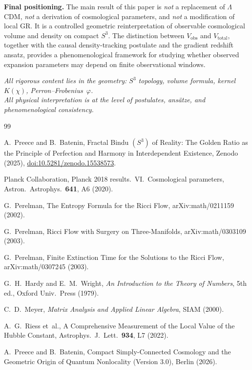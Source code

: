 \documentclass[12pt,a4paper]{amsart}
\theoremstyle{plain}
\theoremstyle{definition}
\theoremstyle{remark}
\newcommand{\vp}{\varphi}
\newcommand{\Sthree}{S^3}
\newcommand{\LCDM}{\ensuremath{\Lambda}CDM}
\newcommand{\Vtot}{V_{\mathrm{total}}}
\newcommand{\Vobs}{V_{\mathrm{obs}}}
\begin{document}
\medskip
\noindent\textbf{Final positioning.} The main result of this paper
is \emph{not} a replacement of \LCDM, \emph{not} a derivation of
cosmological parameters, and \emph{not} a modification of local GR.
It is a controlled geometric reinterpretation of observable
cosmological volume and density on compact $\Sthree$. The distinction
between $\Vobs$ and $\Vtot$, together with the causal density-tracking
postulate and the gradient redshift ansatz, provides a phenomenological
framework for studying whether observed expansion parameters may depend
on finite observational windows.

\medskip
\begin{center}
\textit{All rigorous content lies in the geometry: $\Sthree$ topology,
volume formula, kernel $K(\chi)$, Perron--Frobenius~$\vp$.\\
All physical interpretation is at the level of postulates, ans\"atze,
and phenomenological consistency.}
\end{center}

\begin{thebibliography}{99}

A.~Preece and B.~Batenin,
Fractal Bindu $(S^3)$ of Reality: The Golden Ratio as the Principle of
Perfection and Harmony in Interdependent Existence,
Zenodo (2025), \href{https://doi.org/10.5281/zenodo.15538573}{doi:10.5281/zenodo.15538573}.

Planck Collaboration,
Planck 2018 results.\ VI.\ Cosmological parameters,
Astron.\ Astrophys.\ \textbf{641}, A6 (2020).

G.~Perelman,
The Entropy Formula for the Ricci Flow,
arXiv:math/0211159 (2002).

G.~Perelman,
Ricci Flow with Surgery on Three-Manifolds,
arXiv:math/0303109 (2003).

G.~Perelman,
Finite Extinction Time for the Solutions to the Ricci Flow,
arXiv:math/0307245 (2003).

G.~H.~Hardy and E.~M.~Wright,
\textit{An Introduction to the Theory of Numbers}, 5th ed.,
Oxford Univ.\ Press (1979).

C.~D.~Meyer,
\textit{Matrix Analysis and Applied Linear Algebra}, SIAM (2000).

A.~G.~Riess et~al.,
A Comprehensive Measurement of the Local Value of the Hubble Constant,
Astrophys.\ J.\ Lett.\ \textbf{934}, L7 (2022).

A.~Preece and B.~Batenin,
Compact Simply-Connected Cosmology and the Geometric Origin of Quantum
Nonlocality (Version 3.0), Berlin (2026).

\end{thebibliography}
\end{document}
